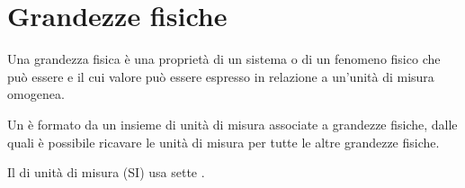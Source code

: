 \documentclass[letterpaper,10pt,italian]{jupyterBook}
\begin{document}
\sphinxstepscope


\chapter{Grandezze fisiche}
\label{\detokenize{ch/intro/physical_quantities:grandezze-fisiche}}\label{\detokenize{ch/intro/physical_quantities:physics-hs-intro-physical-quantities}}\label{\detokenize{ch/intro/physical_quantities::doc}}
\sphinxAtStartPar
Una grandezza fisica è una proprietà di un sistema o di un fenomeno fisico che può essere {\hyperref[\detokenize{ch/intro/measurements:physics-hs-intro-measurements}]{}} e il cui valore può essere espresso in relazione a un’unità di misura omogenea.

\sphinxAtStartPar
Un  è formato da un insieme di unità di misura  associate a grandezze fisiche, dalle quali è possibile ricavare le unità di misura  per tutte le altre grandezze fisiche.

\sphinxAtStartPar
Il  di unità di misura (SI) usa sette .
\end{document}
